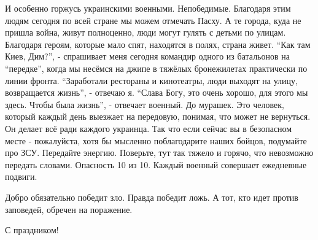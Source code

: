 И особенно горжусь украинскими военными. Непобедимые. Благодаря этим людям
сегодня по всей стране мы можем отмечать Пасху. А те города, куда не пришла
война, живут полноценно, люди могут гулять с детьми по улицам. Благодаря
героям, которые мало спят, находятся в полях, страна живет. \enquote{Как там
Киев, Дим?}, - спрашивает меня сегодня командир одного из батальонов на
\enquote{передке}, когда мы несёмся на джипе в тяжёлых бронежилетах практически
по линии фронта.  \enquote{Заработали рестораны и кинотеатры, люди выходят на
улицу, возвращается жизнь}, - отвечаю я. \enquote{Слава Богу, это очень хорошо,
для этого мы здесь. Чтобы была жизнь}, - отвечает военный. До мурашек. Это
человек, который каждый день выезжает на передовую, понимая, что может не
вернуться. Он делает всё ради каждого украинца. Так что если сейчас вы в
безопасном месте - пожалуйста, хотя бы мысленно поблагодарите наших бойцов,
подумайте про ЗСУ. Передайте энергию.  Поверьте, тут так тяжело и горячо, что
невозможно передать словами. Опасность 10 из 10. Каждый военный совершает
ежедневные подвиги.

Добро обязательно победит зло. Правда победит ложь. А тот, кто идет против
заповедей, обречен на поражение. 

С праздником!
